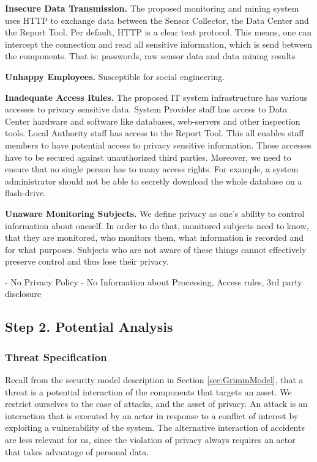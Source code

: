 \textbf{Insecure Data Transmission.}
The proposed monitoring and mining system uses HTTP to exchange data between the Sensor Collector, the Data Center and the Report Tool.
Per default, HTTP is a clear text protocol.
This means, one can intercept the connection and read all sensitive information, which is send between the components.
That is: passwords, raw sensor data and data mining results

\textbf{Unhappy Employees.} Susceptible for social engineering.

\textbf{Inadequate Access Rules.}
The proposed IT system infrastructure has various accesses to privacy sensitive data.
System Provider staff has access to Data Center hardware and software like databases, web-servers and other inspection tools.
Local Authority staff has access to the Report Tool.
This all enables staff members to have potential access to privacy sensitive information.
Those accesses have to be secured against unauthorized third parties.
Moreover, we need to ensure that no single person has to many access rights.
For example, a system administrator should not be able to secretly download the whole database on a flash-drive.


\textbf{Unaware Monitoring Subjects.}
We define privacy as one's ability to control information about oneself.
In order to do that, monitored subjects need to know, that they are monitored, who monitors them, what information is recorded and for what purposes.
Subjects who are not aware of these things cannot effectively preserve control and thus lose their privacy.

- No Privacy Policy
- No Information about Processing, Access rules, 3rd party disclosure

\subsection{Step 2. Potential Analysis}

\subsubsection{Threat Specification}



Recall from the security model description in Section \ref{sec:GrimmModel}, that a threat is a potential interaction of the components that targets an asset.
We restrict ourselves to the case of attacks, and the asset of privacy.
An attack is an interaction that is executed by an actor in response to a conflict of interest by exploiting a vulnerability of the system.
The alternative interaction of accidents are less relevant for us, since the violation of privacy always requires an actor that takes advantage of personal data.

